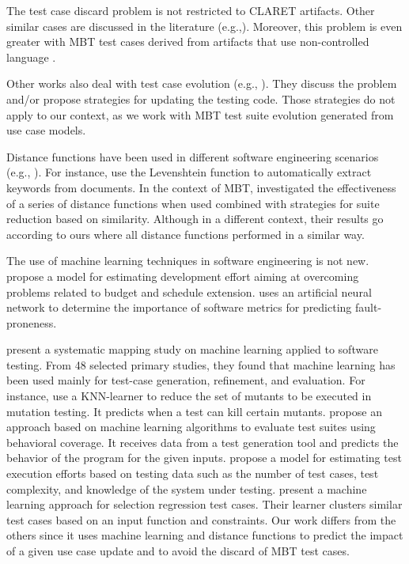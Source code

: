 The test case discard problem is not restricted to CLARET artifacts. Other similar cases are discussed in the literature (e.g.,\citep{de2016full,nogueira2007model}). Moreover, this problem is even greater with MBT test cases derived from artifacts that use non-controlled language \citep{pinto2012understanding}.

Other works also deal with test case evolution (e.g., \citep{katara2006making,pinto2012understanding}). They discuss the problem and/or propose strategies for updating the testing code. Those strategies do not apply to our context, as we work with MBT test suite evolution generated from use case models. 

Distance functions have been used in different software engineering scenarios (e.g., \citep{runkler2000automatic,okuda1976method,lubis2018combination}). For instance, \citet{runkler2000automatic} use the Levenshtein function to automatically extract keywords from documents. In the context of MBT, \citet{coutinho2016analysis} investigated the effectiveness of a series of distance functions when used combined with strategies for suite reduction based on similarity. Although in a different context, their results go according to ours where all distance functions performed in a similar way.

The use of machine learning techniques in software engineering is not new. \citet{baskeles2007software} propose a model for estimating development effort aiming at overcoming problems related to budget and schedule extension. \citet{gondra2008applying} uses an artificial neural network to determine the importance of software metrics for predicting fault-proneness. 

\citet{durelli2019machine} present a systematic mapping study on machine learning applied to software testing. From 48 selected primary studies, they found that machine learning has been used mainly for test-case generation, refinement, and evaluation. For instance, \citet{strug2012machine} use a KNN-learner to reduce the set of mutants to be executed in mutation testing. It predicts when a test can kill certain mutants. \citet{fraser2015assessing} propose an approach based on machine learning algorithms to evaluate test suites using behavioral coverage. It receives data from a test generation tool and predicts the behavior of the program for the given inputs. \citet{zhu2008experience} propose a model for estimating test execution efforts based on testing data such as the number of test cases, test complexity, and knowledge of the system under testing. \citet{chen2011using} present a machine learning approach for selection regression test cases. Their learner clusters similar test cases based on an input function and constraints. Our work differs from the others since it uses machine learning and distance functions to predict the impact of a given use case update and to avoid the discard of MBT test cases. 

